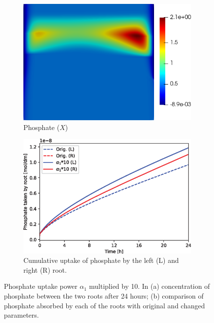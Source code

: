 \documentclass[11pt]{article}
\numberwithin{equation}{section}
\begin{document}
\begin{figure}[!htb]
\centering
\begin{subfigure}[t]{0.35\textwidth}
    \includegraphics[width=\textwidth]{Figures/X_alpha1times10.png}
    \caption{Phosphate ($X$)}
    \label{fig:numexp_a1_up1}
\end{subfigure}
\hspace{1cm}
\begin{subfigure}[t]{0.4\textwidth}
    \includegraphics[width=\textwidth]{Figures/alpha1times10.eps}
    \caption{Cumulative uptake of phosphate by the left (L) and right (R) root.}
    \label{fig:numexp_a1_up2}
\end{subfigure}
\caption{Phosphate uptake power $\alpha_1$ multiplied by 10. In (a) concentration of phosphate between the two roots after 24 hours; (b) comparison of phosphate absorbed by each of the roots with original and changed parameters.}
\label{fig:numexp_a1_up}
\end{figure}
\end{document}
